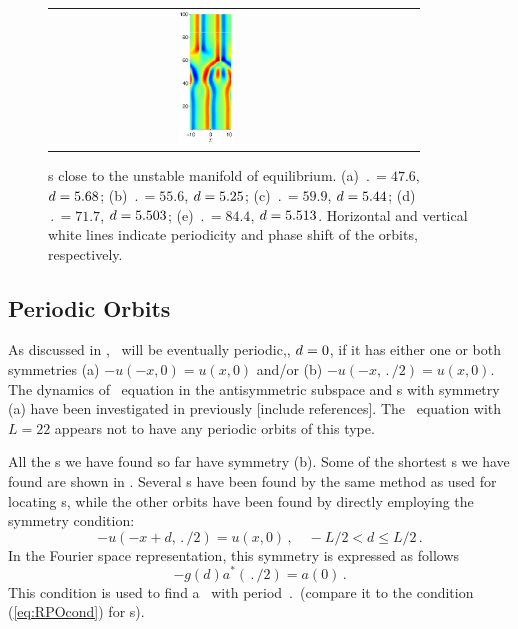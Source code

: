 \begin{figure}[t]
\begin{center}
\begin{tabular}{ccccc}
\includegraphics[width=0.18\textwidth]{figs/ks22rpo084.4-05.51.eps}
\end{tabular}
\end{center}
\caption{\Rpo s close to the unstable manifold of  equilibrium. 
(a) $\period{} = 47.6$, $d = 5.68$; 
(b) $\period{} = 55.6$, $d = 5.25$; 
(c) $\period{} = 59.9$, $d = 5.44$; 
(d) $\period{} = 71.7$, $d = 5.503$; 
(e) $\period{} = 84.4$, $d = 5.513$. 
Horizontal and vertical white lines indicate periodicity and 
phase shift of the orbits, respectively. }\label{f:ks22rposCage}
\end{figure}

\subsection{Periodic Orbits} \label{ssec:po}
As discussed in , \rpo\ will be eventually 
periodic,\ie, $d = 0$, if it has either one or both symmetries
(a) $-u(-x,0) = u(x,0)$ and/or (b) $-u(-x,\period{}/2) =
u(x,0)$.  
The dynamics of \KS\ equation in the antisymmetric subspace and
\po s with symmetry (a) have been investigated in previously 
[include references]. The \KS\ equation with $L =
22$ appears not to have any periodic orbits of this type.


All the \po s we have found so far have symmetry (b).
Some of the shortest \po s we have found are shown in 
.  Several \po s have been found by the same 
method as used for locating \rpo s, while the other orbits have been 
found by directly employing the symmetry condition:
\[ -u(-x+d,\period{}/2) = u(x,0)\,, \quad -L/2 < d \leq L/2\,.\]
In the Fourier space representation, this symmetry is expressed as
follows
\[
 -g(d)a^\ast(\period{}/2) = a(0)\,.
\]
This condition is used to find a \po\ with period $\period{}$ 
(compare it to the condition (\ref{eq:RPOcond}) for \rpo s). 

